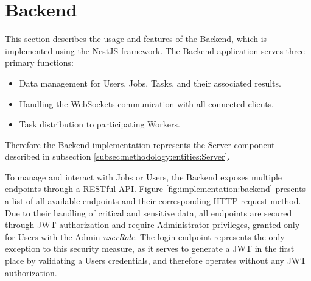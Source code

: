\section{Backend}
\label{sec:implementation:backend}
This section describes the usage and features of the Backend, which is implemented using the NestJS framework. The Backend application serves three primary functions: 

\begin{itemize}
    \item Data management for Users, Jobs, Tasks, and their associated results.
    \item Handling the WebSockets communication with all connected clients.
    \item Task distribution to participating Workers.
\end{itemize}

Therefore the Backend implementation represents the Server component described in subsection \ref{subsec:methodology:entities:Server}.

To manage and interact with Jobs or Users, the Backend exposes multiple endpoints through a \acs{REST}ful \ac{API}. Figure \ref{fig:implementation:backend} presents a list of all available endpoints and their corresponding \acs{HTTP} request method. Due to their handling of critical and sensitive data, all endpoints are secured through \ac{JWT} authorization and require Administrator privileges, granted only for Users with the Admin \emph{userRole}. The login endpoint represents the only exception to this security measure, as it serves to generate a \ac{JWT} in the first place by validating a Users credentials, and therefore operates without any \ac{JWT} authorization.

